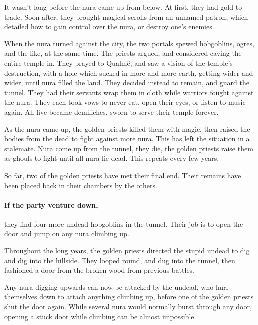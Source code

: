 \begin{multicols}{2}
\begin{exampletext}
It wasn't long before the nura came up from below.
At first, they had gold to trade.
Soon after, they brought magical scrolls from an unnamed patron, which detailed how to gain control over the nura, or destroy one's enemies.

When the nura turned against the city, the two portals spewed hobgoblins, ogres, and the like, at the same time.
The priests argued, and considered caving the entire temple in.
They prayed to Qualm\"{e}, and saw a vision of the temple's destruction, with a hole which sucked in more and more earth, getting wider and wider, until nura filled the land.
They decided instead to remain, and guard the tunnel.
They had their servants wrap them in cloth while warriors fought against the nura.
They each took vows to never eat, open their eyes, or listen to music again.
All five became demiliches, sworn to serve their temple forever.

As the nura came up, the golden priests killed them with magic, then raised the bodies from the dead to fight against more nura.
This has left the situation in a stalemate.
Nura come up from the tunnel, they die, the golden priests raise them as ghouls to fight until all nura lie dead.
This repeats every few years.

So far, two of the golden priests have met their final end.
Their remains have been placed back in their chambers by the others.

\end{exampletext}


\paragraph{If the party venture down,}
they find four more undead hobgoblins in the tunnel.
Their job is to open the door and jump on any nura climbing up.

\begin{exampletext}

  Throughout the long years, the golden priests directed the stupid undead to dig and dig into the hillside.
  They looped round, and dug into the tunnel, then fashioned a door from the broken wood from previous battles.

Any nura digging upwards can now be attacked by the undead, who hurl themselves down to attach anything climbing up, before one of the golden priests shut the door again.
While several nura would normally burst through any door, opening a stuck door while climbing can be almost impossible.

\end{exampletext}

\end{multicols}
